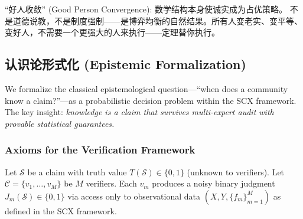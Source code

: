 \begin{remark}[命名]
``好人收敛'' (Good Person Convergence): 数学结构本身使诚实成为占优策略。
不是道德说教，不是制度强制——是博弈均衡的自然结果。所有人变老实、变平等、
变好人，不需要一个更强大的人来执行——定理替你执行。
\end{remark}

\subsection{认识论形式化 (Epistemic Formalization)}
\label{sec:epistemic}

We formalize the classical epistemological question---``when does a
community know a claim?''---as a probabilistic decision problem within
the SCX framework. The key insight: \emph{knowledge is a claim that
survives multi-expert audit with provable statistical guarantees.}

\subsubsection{Axioms for the Verification Framework}
\label{sec:epistemic-axioms}

\begin{definition}
\label{def:verification-framework}
Let $\mathcal{S}$ be a claim with truth value $T(\mathcal{S})\in\{0,1\}$
(unknown to verifiers). Let $\mathcal{C}=\{v_1,\ldots,v_M\}$ be $M$
verifiers. Each $v_m$ produces a noisy binary judgment
$J_m(\mathcal{S})\in\{0,1\}$ via access only to observational data
$(X,Y,\{f_m\}_{m=1}^M)$ as defined in the SCX framework.
\end{definition}

